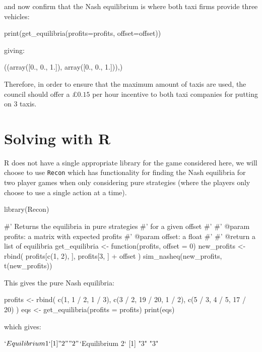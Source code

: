 and now confirm that the Nash equilibrium is where both taxi firms provide
three vehicles:

\begin{pyin}
print(get_equilibria(profits=profits, offset=offset))
\end{pyin}

giving:

\begin{pyout}
((array([0., 0., 1.]), array([0., 0., 1.])),)
\end{pyout}

Therefore, in order to ensure that the maximum amount of taxis are used, the
council should offer a \(\pounds 0.15\) per hour incentive to both taxi
companies for putting on 3 taxis.

\section{Solving with R}\label{sec:game_theory_solving-with-R}

R does not have a single appropriate library for the game considered here, we
will choose to use \texttt{Recon} which has functionality for finding the
Nash equilibria for two player games when only considering pure strategies
(where the players only choose to use a single action at a time).

\begin{Rin}
library(Recon)

#' Returns the equilibria in pure strategies
#' for a given offset
#'
#' @param profits: a matrix with expected profits
#' @param offset: a float
#'
#' @return a list of equilibria
get_equilibria <- function(profits, offset = 0){
  new_profits <- rbind(
    profits[c(1, 2), ],
    profits[3, ] + offset
  )
  sim_nasheq(new_profits, t(new_profits))
}
\end{Rin}


This gives the pure Nash equilibria:

\begin{Rin}

profits <- rbind(
  c(1, 1 / 2, 1 / 3),
  c(3 / 2, 19 / 20, 1 / 2),
  c(5 / 3, 4 / 5, 17 / 20)
)
eqs <- get_equilibria(profits = profits)
print(eqs)
\end{Rin}

which gives:

\begin{Rout}
$`Equilibrium 1`
[1] "2" "2"

$`Equilibrium 2`
[1] "3" "3"

\end{Rout}

